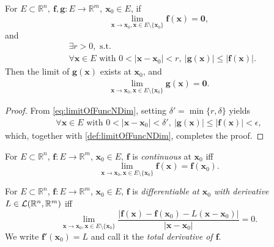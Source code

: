\begin{lem}
  \label{lem:squeezeTestOnVectorFunc}
  For $E\subset \mathbb{R}^{n},\ \mathbf{f},\mathbf{g}:
  E\rightarrow \mathbb{R}^{m},\ \mathbf{x}_{0}\in E$, if
  \begin{displaymath}
     \lim_{\mathbf{x}\rightarrow \mathbf{x}_{0},
    \mathbf{x}\in E\setminus\{\mathbf{x}_{0}\}}
    \mathbf{f}(\mathbf{x})=\mathbf{0},
  \end{displaymath}
  and
  \begin{align*}
    &\exists r>0, \text{ s.t. }\\
    &\forall \mathbf{x}\in E\text{ with }0<|\mathbf{x}-\mathbf{x}_{0}|<r,
    \ |\mathbf{g}(\mathbf{x})|\le|\mathbf{f}(\mathbf{x})|.
  \end{align*}
  Then the limit of $\mathbf{g}(\mathbf{x})$ exists at $\mathbf{x}_{0}$,
  and
  \begin{align*}
    \lim_{\mathbf{x}\rightarrow \mathbf{x}_{0},
    \mathbf{x}\in E\setminus\{\mathbf{x}_{0}\}}
    \mathbf{g}(\mathbf{x})=\mathbf{0}.
  \end{align*}
\end{lem}
\begin{proof}
  From \eqref{eq:limitOfFuncNDim},
  setting $\delta'=\min\{r,\delta\}$ yields
  \begin{align*}
    \forall \mathbf{x}\in E\text{ with }
    0<|\mathbf{x}-\mathbf{x}_{0}|<\delta',
    \ |\mathbf{g}(\mathbf{x})|\le|\mathbf{f}(\mathbf{x})|<\epsilon,
  \end{align*}
  which, together with \ref{def:limitOfFuncNDim}, completes the proof.
\end{proof} 

\begin{defn}
  \label{def:continuousNdim}
  For $E\subset \mathbb{R}^n$, $\mathbf{f}: E\rightarrow \mathbb{R}^m$,
  $\mathbf{x}_0\in E$, $\mathbf{f}$ is \emph{continuous} at $\mathbf{x}_0$
  iff
  \begin{equation}
    \label{eq:continuousNdim}
    \lim_{\mathbf{x}\rightarrow \mathbf{x}_{0},\mathbf{x}\in E\setminus\{\mathbf{x}_{0}\}}
    \mathbf{f}(\mathbf{x})=\mathbf{f}(\mathbf{x}_{0}).
  \end{equation}
\end{defn}

\begin{defn}
  \label{def:derivativeNdim}
  For $E\subset \mathbb{R}^n$, $\mathbf{f}: E\rightarrow \mathbb{R}^m$,
  $\mathbf{x}_0\in E$, $\mathbf{f}$ is
  \emph{differentiable at $\mathbf{x}_0$ with derivative}
  $L\in{\cal L}(\mathbb{R}^n,\mathbb{R}^m)$
  iff 
  \begin{equation}
    \label{eq:derivativeNdim}
    \lim_{\mathbf{x}\rightarrow \mathbf{x}_0, \mathbf{x}\in E\setminus\{\mathbf{x}_0\}}
    \frac{|\mathbf{f}(\mathbf{x})- \mathbf{f}(\mathbf{x}_0)
      - L(\mathbf{x}-\mathbf{x}_0)|}{|\mathbf{x}-\mathbf{x}_0|}=0. 
  \end{equation}
  We write $\mathbf{f}'(\mathbf{x}_0)=L$
  and call it the \emph{total derivative of $\mathbf{f}$}.
\end{defn}


